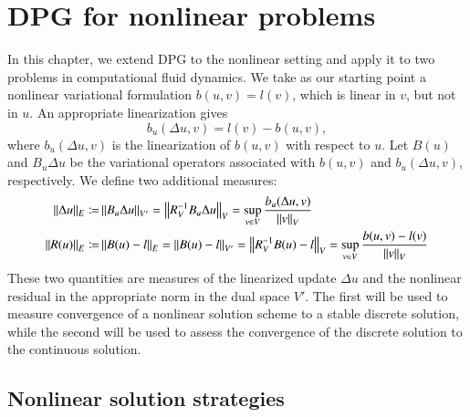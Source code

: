 \section{DPG for nonlinear problems}
In this chapter, we extend DPG to the nonlinear setting and apply it to two problems in computational fluid dynamics.  We take as our starting point a nonlinear variational formulation
$b(u,v) = l(v)$, which is linear in $v$, but not in $u$.  An appropriate linearization gives
\[
b_u(\Delta u,v) = l(v) - b(u,v),
\]
where $b_u(\Delta u,v)$ is the linearization of $b(u,v)$ with respect to $u$.  Let $B(u)$ and $B_u\Delta u$ be the variational operators associated with $b(u,v)$ and $b_u(\Delta u,v)$, respectively.  We define two additional measures: 
\begin{align*}
\|\Delta u\|_E \coloneqq & \nor{B_u\Delta u}_{V'} = \nor{R_V^{-1} B_u\Delta u}_V = \sup_{v\in V} \frac{b_u(\Delta u,v)}{\nor{v}_V}\\
\nor{R(u)}_E \coloneqq & \nor{B(u)-l}_E = \nor{B(u) - l}_{V'}  = \nor{R_V^{-1} B(u)-l}_V = \sup_{v\in V} \frac{b(u,v)-l(v)}{\nor{v}_V}
\end{align*}
These two quantities are measures of the linearized update $\Delta u$ and the nonlinear residual in the appropriate norm in the dual space $V'$.  The first will be used to measure convergence of a nonlinear solution scheme to a stable discrete solution, while the second will be used to assess the convergence of the discrete solution to the continuous solution.  

\subsection{Nonlinear solution strategies}

